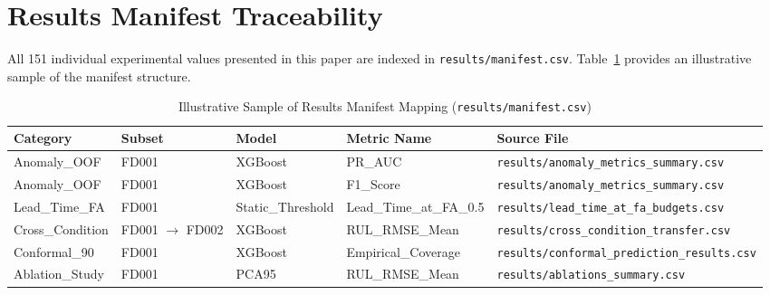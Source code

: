 \section{Results Manifest Traceability}
\label{sec:manifest_traceability}

All 151 individual experimental values presented in this paper are indexed in \texttt{results/manifest.csv}. Table~\ref{tab:manifest_sample} provides an illustrative sample of the manifest structure.

\begin{table}[t!]
\centering
\small
\caption{Illustrative Sample of Results Manifest Mapping (\texttt{results/manifest.csv})}
\label{tab:manifest_sample}
\begin{tabular}{llllp{6.5cm}}
\toprule
\textbf{Category} & \textbf{Subset} & \textbf{Model} & \textbf{Metric Name} & \textbf{Source File} \\
\midrule
Anomaly\_OOF & FD001 & XGBoost & PR\_AUC & \texttt{results/anomaly\_metrics\_summary.csv} \\
Anomaly\_OOF & FD001 & XGBoost & F1\_Score & \texttt{results/anomaly\_metrics\_summary.csv} \\
Lead\_Time\_FA & FD001 & Static\_Threshold & Lead\_Time\_at\_FA\_0.5 & \texttt{results/lead\_time\_at\_fa\_budgets.csv} \\
Cross\_Condition & FD001 $\to$ FD002 & XGBoost & RUL\_RMSE\_Mean & \texttt{results/cross\_condition\_transfer.csv} \\
Conformal\_90 & FD001 & XGBoost & Empirical\_Coverage & \texttt{results/conformal\_prediction\_results.csv} \\
Ablation\_Study & FD001 & PCA95 & RUL\_RMSE\_Mean & \texttt{results/ablations\_summary.csv} \\
\bottomrule
\end{tabular}
\end{table}
